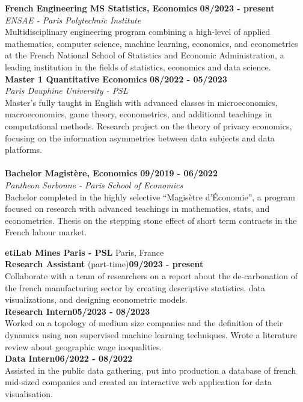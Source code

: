 	\begin{flushleft}
	\raisebox{-.6ex}{HIGHER EDUCATION} \hrulefill
	\end{flushleft}

	
\noindent\textbf{French Engineering MS \textbar\space Statistics,  Economics}
\hfill
\textbf{08/2023 - present} \\
\emph{ENSAE - Paris Polytechnic Institute}\\
Multidisciplinary engineering program combining a high-level of applied mathematics, computer science, machine learning, economics, and  econometrics at the French National School of Statistics and Economic Administration, a leading institution in the fields of statistics, economics and data science.  \\

\noindent\textbf{Master 1 \textbar\space Quantitative Economics}
\hfill
\textbf{08/2022 - 05/2023} \\
\emph{Paris Dauphine University - PSL}\\
Master's fully taught in English with advanced classes in microeconomics, macroeconomics, game theory,  econometrics, and additional teachings in computational methods. Research project on the theory of privacy economics, focusing on the information asymmetries between data subjects and data platforms. \\
\\
\noindent\textbf{Bachelor \textbar\space Magistère, Economics}
\hfill
\textbf{09/2019 - 06/2022} \\
\emph{Pantheon Sorbonne - Paris School of Economics}\\
Bachelor completed in the highly selective “Magisètre d'Économie”, a program focused on research with advanced teachings in mathematics, stats, and econometrics. Thesis on the stepping stone effect
of short term contracts in the French labour market.


	\begin{flushleft}
	\raisebox{-.6ex}{WORK EXPERIENCE} \hrulefill
	\end{flushleft}


\noindent\textbf{etiLab Mines Paris - PSL} \hfill Paris, France\\[0.1cm]
\textbf{Research Assistant} (part-time)\hfill \textbf{09/2023 - present} \\
Collaborate with a team of researchers on a report about the de-carbonation of the french manufacturing sector by creating descriptive statistics, data visualizations, and designing econometric models. \\
\textbf{Research Intern}\hfill \textbf{05/2023 - 08/2023} \\
Worked on a topology of medium size companies and the definition of their dynamics using non supervised machine learning techniques. Wrote a literature review about geographic wage inequalities.  \\[0.1cm]
\textbf{Data Intern}\hfill \textbf{06/2022 - 08/2022} \\
Assisted in the public data gathering, put into production a database of french mid-sized companies and created an interactive web application for data visualisation.\\

